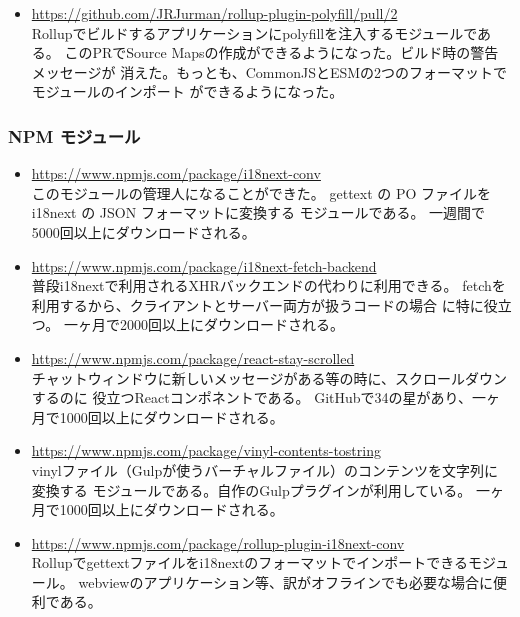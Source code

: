 \documentclass{res}
\begin{document}
\begin{resume}
\begin{itemize}
  \item \url{https://github.com/JRJurman/rollup-plugin-polyfill/pull/2} \\
  Rollupでビルドするアプリケーションにpolyfillを注入するモジュールである。
  このPRでSource Mapsの作成ができるようになった。ビルド時の警告メッセージが
  消えた。もっとも、CommonJSとESMの2つのフォーマットでモジュールのインポート
  ができるようになった。
\end{itemize}

\subsubsection{NPM モジュール}

\begin{itemize}
  \item \url{https://www.npmjs.com/package/i18next-conv} \\
  このモジュールの管理人になることができた。
  gettext の PO ファイルを i18next の JSON フォーマットに変換する モジュールである。
  一週間で5000回以上にダウンロードされる。

  \item \url{https://www.npmjs.com/package/i18next-fetch-backend} \\
  普段i18nextで利用されるXHRバックエンドの代わりに利用できる。
  fetchを利用するから、クライアントとサーバー両方が扱うコードの場合
  に特に役立つ。
  一ヶ月で2000回以上にダウンロードされる。

  \item \url{https://www.npmjs.com/package/react-stay-scrolled} \\
  チャットウィンドウに新しいメッセージがある等の時に、スクロールダウンするのに
  役立つReactコンポネントである。
  GitHubで34の星があり、一ヶ月で1000回以上にダウンロードされる。

  \item \url{https://www.npmjs.com/package/vinyl-contents-tostring} \\
  vinylファイル（Gulpが使うバーチャルファイル）のコンテンツを文字列に変換する
  モジュールである。自作のGulpプラグインが利用している。
  一ヶ月で1000回以上にダウンロードされる。

  \item \url{https://www.npmjs.com/package/rollup-plugin-i18next-conv} \\
  Rollupでgettextファイルをi18nextのフォーマットでインポートできるモジュール。
  webviewのアプリケーション等、訳がオフラインでも必要な場合に便利である。


\end{itemize}
\end{resume}
\end{document}
